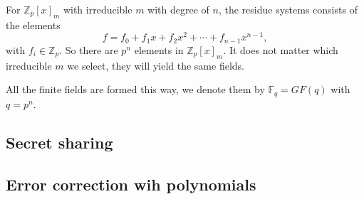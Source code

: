 \documentclass{article}
\newcommand{\Z}{\mathbb{Z}}
\begin{document}
For $\Z_p[x]_m$ with irreducible $m$ with degree of $n$, the residue systems consists of the elements
\[
    f = f_0 + f_1 x + f_2 x^2 + \cdots + f_{n-1} x^{n-1},
\]
with $f_i \in \Z_p$. So there are $p^n$ elements in $\Z_p[x]_m$. It does not matter which irreducible $m$ we select, they will yield the same fields.

All the finite fields are formed this way, we denote them by $\mathbb{F}_q = GF(q)$ with $q=p^n$.

\subsection{Secret sharing}
\subsection{Error correction wih polynomials}
\end{document}
